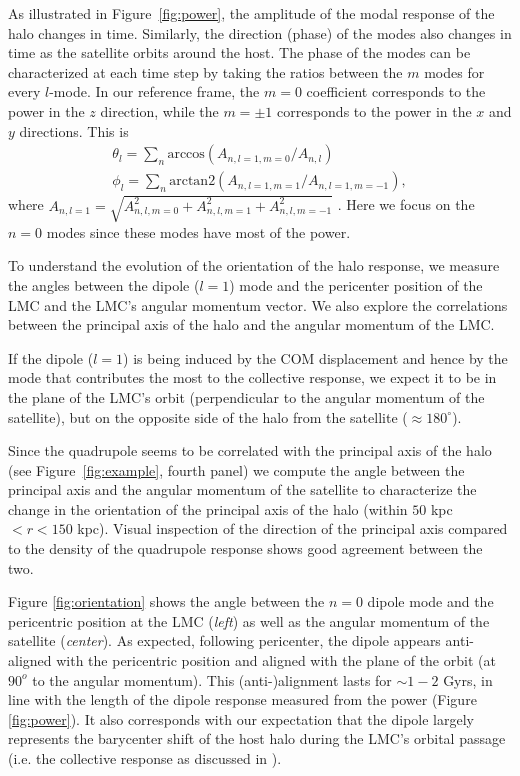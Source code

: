 \documentclass[twocolumn, linenumbers]{openjournal}
\begin{document}
 
As illustrated in Figure~\ref{fig:power}, the amplitude of the modal response of the halo changes in time. Similarly, the direction (phase) of the modes also changes in time as the satellite orbits around the host. The phase of the modes can be characterized at each time step by taking the ratios between the $m$ modes for every $l$-mode.  In our reference frame, the $m=0$ coefficient corresponds to the power in the $z$ direction, while the $m = \pm 1$ corresponds to the power in the $x$ and $y$ directions. This is
\begin{equation}
\begin{split}
    \theta_{l} =  \sum_n \mathrm{arccos}(A_{n, l=1, m=0} / A_{n, l})  \\ 
    \phi_{l} = \sum_n \mathrm{arctan2}(A_{n, l=1, m=1}/A_{n, l=1, m=-1}),
\end{split}
\end{equation}
where $ A_{n,l=1} = \sqrt{A_{n, l, m=0}^2 + A_{n, l, m=1}^2 + A_{n, l, m=-1}^2}$ . Here we focus on the $n=0$ modes since these modes have most of the power.  

To understand the evolution of the orientation of the halo response, we measure the angles between the dipole ($l=1$) mode and the pericenter position of the LMC and the LMC's angular momentum vector. We also explore the correlations between the principal axis of the halo and the angular momentum of the LMC. 




If the dipole ($l=1$) is being induced by the COM displacement and hence by the mode that contributes the most to the collective response, we expect it to be in the plane of the LMC's orbit (perpendicular to the angular momentum of the satellite), but on the opposite side of the halo from the satellite ($\approx 180^{\circ}$).

Since the quadrupole seems to be correlated with the principal axis of the halo (see 
Figure~\ref{fig:example}, fourth panel) we  compute the angle between the principal
axis and the angular momentum of the satellite to characterize the change in the 
orientation of the principal axis of the halo  (within $50$ kpc $< r < 150$ kpc). Visual 
inspection of the direction of the principal axis compared to the density of the quadrupole response shows good agreement between the two. 

Figure \ref{fig:orientation} shows the angle between the $n=0$ dipole mode and 
the pericentric position at the LMC (\emph{left}) as well as the angular momentum of the 
satellite (\emph{center}). As expected, following pericenter, the dipole appears anti-aligned 
with the pericentric position and aligned with the plane of the orbit (at $90^o$ to the 
angular momentum). This (anti-)alignment lasts for $\sim 1-2$ Gyrs, 
in line with the length of the dipole response measured from the power (Figure \ref{fig:power}). 
It also corresponds with our expectation that the dipole largely represents the 
barycenter shift of the host halo during the LMC's orbital passage (i.e. the collective response as discussed in \citealt{Weinberg98, Gomez16, Garavito_Camargo_2021}). 
\end{document}
